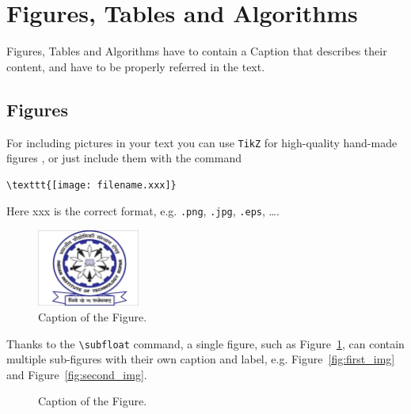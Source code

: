 \documentclass[11pt,a4paper]{article}
\begin{document}
\section{Figures, Tables and Algorithms}

Figures, Tables and Algorithms have to contain a Caption that describes their content, and have to be properly referred in the text.

\subsection{Figures}
\label{subsec:figures}

For including pictures in your text you can use \texttt{TikZ} for high-quality hand-made figures \cite{tikz},
or just include them with the command
\begin{verbatim}
\texttt{[image: filename.xxx]}
\end{verbatim}
Here xxx is the correct format, e.g.  \verb|.png|, \verb|.jpg|, \verb|.eps|, \dots.

\begin{figure}[H]
    \centering
    \includegraphics[width=0.3\textwidth]{Images/IIT_Rpr_logo.jpg}
    \caption{Caption of the Figure.}
    \label{fig:quadtree}
\end{figure}

Thanks to the \texttt{\textbackslash subfloat} command, a single figure, such as Figure~\ref{fig:quadtree},
can contain multiple sub-figures with their own caption and label, e.g. Figure~\ref{fig:first_img} and Figure~\ref{fig:second_img}. 

\begin{figure}[H]
    \centering
    \quad
    \caption[]{Caption of the Figure.}
    \label{fig:quadtree2}
\end{figure}
\end{document}
